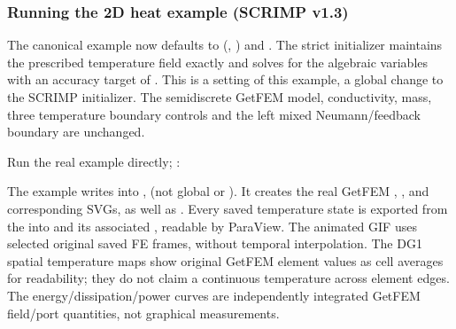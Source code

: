 \documentclass[letterpaper,10pt,english]{sphinxmanual}
\begin{document}
\subsubsection{Running the 2\sphinxhyphen{}D heat example (SCRIMP v1.3)}
\label{\detokenize{examples/heat:running-the-2-d-heat-example-scrimp-v1-3}}\label{\detokenize{examples/heat:heat-v130-showcase}}
\sphinxAtStartPar
The canonical example now defaults to 
(, ) and . The strict initializer maintains the prescribed
temperature field exactly and solves for the algebraic variables with
an accuracy target of . This is a setting of this example,
 a global change to the SCRIMP initializer. The semi\sphinxhyphen{}discrete
GetFEM model, conductivity, mass, three temperature boundary controls
and the left mixed Neumann/feedback boundary are unchanged.

\sphinxAtStartPar
Run the real example directly; :

\begin{sphinxVerbatim}[commandchars=\\\{\}]
\end{sphinxVerbatim}

\sphinxAtStartPar
The example writes into ,
 (not global  or
). It creates the real GetFEM
,
,
 and corresponding SVGs,
as well as .
Every saved temperature state is exported from the
 into
 and its associated ,
readable
by ParaView. The animated GIF uses selected original saved FE frames,
without temporal interpolation. The DG1 spatial temperature maps
show original GetFEM element values as cell averages for readability;
they do not claim a continuous temperature across element edges.
The energy/dissipation/power curves are independently integrated
GetFEM field/port quantities, not graphical measurements.
\end{document}

